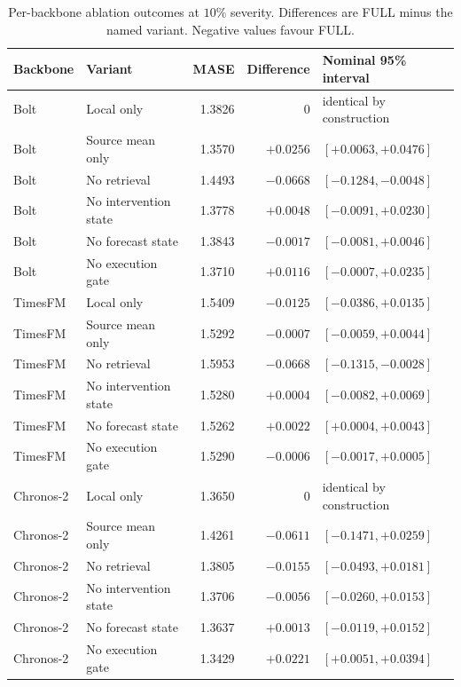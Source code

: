 \documentclass{article}
\begin{document}
\begin{table}[htbp]
\centering\small
\caption{Per-backbone ablation outcomes at $10\%$ severity. Differences are FULL minus the
named variant. Negative values favour FULL.}
\label{tab:v52-a2}
\begin{tabular*}{\textwidth}{@{\extracolsep{\fill}}llrrl@{}}
\toprule
Backbone & Variant & MASE & Difference & Nominal 95\% interval \\
\midrule
Bolt & Local only & 1.3826 & $0$ & identical by construction \\
Bolt & Source mean only & 1.3570 & $+0.0256$ & $[+0.0063,+0.0476]$ \\
Bolt & No retrieval & 1.4493 & $-0.0668$ & $[-0.1284,-0.0048]$ \\
Bolt & No intervention state & 1.3778 & $+0.0048$ & $[-0.0091,+0.0230]$ \\
Bolt & No forecast state & 1.3843 & $-0.0017$ & $[-0.0081,+0.0046]$ \\
Bolt & No execution gate & 1.3710 & $+0.0116$ & $[-0.0007,+0.0235]$ \\
TimesFM & Local only & 1.5409 & $-0.0125$ & $[-0.0386,+0.0135]$ \\
TimesFM & Source mean only & 1.5292 & $-0.0007$ & $[-0.0059,+0.0044]$ \\
TimesFM & No retrieval & 1.5953 & $-0.0668$ & $[-0.1315,-0.0028]$ \\
TimesFM & No intervention state & 1.5280 & $+0.0004$ & $[-0.0082,+0.0069]$ \\
TimesFM & No forecast state & 1.5262 & $+0.0022$ & $[+0.0004,+0.0043]$ \\
TimesFM & No execution gate & 1.5290 & $-0.0006$ & $[-0.0017,+0.0005]$ \\
Chronos-2 & Local only & 1.3650 & $0$ & identical by construction \\
Chronos-2 & Source mean only & 1.4261 & $-0.0611$ & $[-0.1471,+0.0259]$ \\
Chronos-2 & No retrieval & 1.3805 & $-0.0155$ & $[-0.0493,+0.0181]$ \\
Chronos-2 & No intervention state & 1.3706 & $-0.0056$ & $[-0.0260,+0.0153]$ \\
Chronos-2 & No forecast state & 1.3637 & $+0.0013$ & $[-0.0119,+0.0152]$ \\
Chronos-2 & No execution gate & 1.3429 & $+0.0221$ & $[+0.0051,+0.0394]$ \\
\bottomrule
\end{tabular*}
\end{table}
\end{document}
